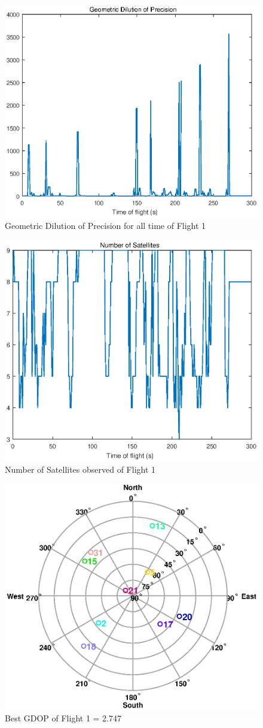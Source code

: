 \documentclass[Space3_Assign2]{subfile}
\begin{document}
\begin{figure}
\centering
\includegraphics[width=0.8\linewidth]{DOPall.eps}
\caption{Geometric Dilution of Precision for all time of Flight 1}
\label{fig:DOPall}
\end{figure}
\begin{figure}
\centering
\includegraphics[width=0.8\linewidth]{SatNo.eps}
\caption{Number of Satellites observed of Flight 1}
\label{fig:SatNo}
\end{figure}
\begin{figure}
\centering
\includegraphics[width=0.8\linewidth]{BestDOP.eps}
\caption{Best GDOP of Flight 1 = 2.747}
\label{fig:BestDOP}
\end{figure}
\end{document}
